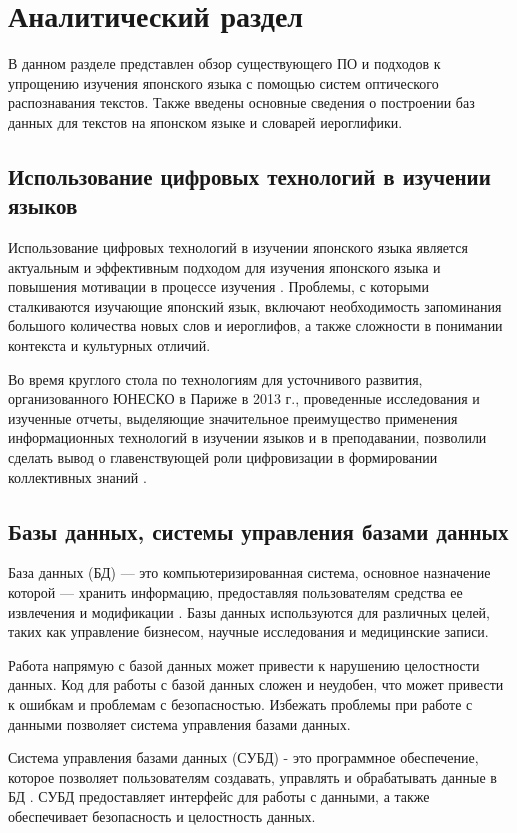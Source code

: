 \chapter{Аналитический раздел}

В данном разделе представлен обзор существующего ПО
и подходов к упрощению изучения японского языка с
помощью систем оптического распознавания текстов. Также
введены основные сведения о построении баз данных
для текстов на японском языке и словарей иероглифики.

\section{Использование цифровых технологий в изучении языков}

Использование цифровых технологий в изучении японского языка 
является актуальным и эффективным подходом для изучения
японского языка и повышения мотивации в процессе
изучения \cite{digital-era}. Проблемы, с которыми сталкиваются
изучающие японский язык, включают необходимость запоминания большого количества новых
слов и иероглифов, а также сложности в понимании контекста
и культурных отличий.

Во время круглого стола по технологиям для усточнивого развития, организованного ЮНЕСКО в Париже в 2013 г.,
проведенные исследования и изученные отчеты, выделяющие значительное
преимущество применения информационных технологий в изучении языков
и в преподавании, позволили сделать вывод о главенствующей роли
цифровизации в формировании коллективных знаний \cite{japanese-comp}.

\section{Базы данных, системы управления базами данных}

База данных (БД) --- это компьютеризированная система, основное назначение
которой --- хранить информацию, предоставляя пользователям
средства ее извлечения и модификации \cite[46]{date}. Базы данных
используются для различных целей, таких как управление бизнесом,
научные исследования и медицинские записи.

Работа напрямую с базой данных может привести к нарушению целостности данных. Код для работы с базой данных сложен и неудобен, что может привести к ошибкам и проблемам с безопасностью. Избежать проблемы при работе с данными позволяет система управления базами данных.

Система управления базами данных (СУБД) - это программное
обеспечение, которое позволяет пользователям создавать,
управлять и обрабатывать данные в БД \cite[10--12]{pearson-subd}.
СУБД предоставляет интерфейс для работы с данными, а также обеспечивает
безопасность и целостность данных.

